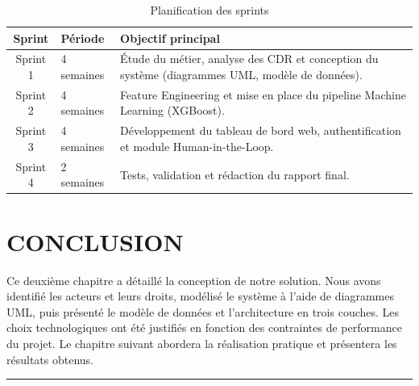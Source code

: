\documentclass[12pt, oneside, a4paper]{report}
\begin{document}
\begin{table}[htbp]
\centering
\caption{Planification des sprints}
\label{tab:sprints}

\renewcommand{\arraystretch}{1.3}
\begin{tabular}{|c|p{5cm}|p{5cm}|}
\hline
\textbf{Sprint} & \textbf{Période} & \textbf{Objectif principal} \\
\hline
Sprint 1 & 4 semaines & Étude du métier, analyse des CDR et conception du système (diagrammes UML, modèle de données). \\
\hline
Sprint 2 & 4 semaines & Feature Engineering et mise en place du pipeline Machine Learning (XGBoost). \\
\hline
Sprint 3 & 4 semaines & Développement du tableau de bord web, authentification et module Human-in-the-Loop. \\
\hline
Sprint 4 & 2 semaines & Tests, validation et rédaction du rapport final. \\
\hline
\end{tabular}
\end{table}


\section{CONCLUSION}
Ce deuxième chapitre a détaillé la conception de notre solution. Nous avons identifié les acteurs et leurs droits, modélisé le système à l’aide de diagrammes UML, puis présenté le modèle de données et l’architecture en trois couches. Les choix technologiques ont été justifiés en fonction des contraintes de performance du projet. Le chapitre suivant abordera la réalisation pratique et présentera les résultats obtenus.

\clearpage
\thispagestyle{fancy} %
\setcounter{section}{0}

\noindent\rule[-0.2cm]{0.45cm}{1.2cm}\hspace{0.15cm}%
\raisebox{0.85cm}{\rule{0.85\textwidth}{0.5pt}}\\[0.3cm]
\noindent{}\\[1cm]
\end{document}
